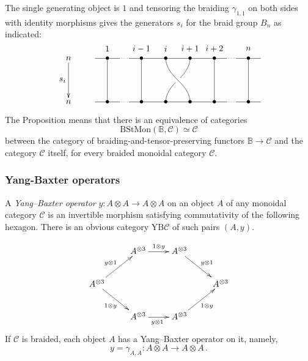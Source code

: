 \documentclass{beamer}
\newcommand{\lra}{\longrightarrow}
\def\CC{{\mathscr C}}
\begin{document}
\begin{frame}
The single generating object is $1$ and tensoring the braiding $\gamma^{}_{1,1}$ on both sides with identity morphisms gives the generators $s_i$ for the braid group $B_n$ as indicated:
\[
\xy
(-30,18)*+{n};(-30,0)*+{n} **\dir{-} \POS?(.5)*+!R{s_i} ?>*\dir{>};
(-19,18);(-9,18) **\dir{-};
(-9,18);(-5,18) **\dir{.};
(-5,18);(35,18) **\dir{-};
(35,18);(39,18) **\dir{.};
(39,18);(49,18) **\dir{-};
(-19,0);(-9,0) **\dir{-};
(-9,0);(-5,0) **\dir{.};
(-5,0);(35,0) **\dir{-};
(35,0);(39,0) **\dir{.};
(39,0);(49,0) **\dir{-};
(-14,18)*{\bullet}="T1"+(0,4)*{1};
(0,18)*{\bullet}="T2"+(0,4)*{i-1};
(10,18)*{\bullet}="T3"+(0,4)*{i};
(20,18)*{\bullet}="T4"+(0,4)*{i+1};
(30,18)*{\bullet}="T5"+(0,4)*{i+2};
(44,18)*{\bullet}="T6"+(0,4)*{n};
(-14,0)*{\bullet}="B1"; 
(0,0)*{\bullet}="B2"; 
(10,0)*{\bullet}="B3"; 
(20,0)*{\bullet}="B4";
(30,0)*{\bullet}="B5";
(44,0)*{\bullet}="B6";
"T1";"B1" **\dir{-};
"T2";"B2" **\dir{-};
(15,9)*{\hole}="a";
(15,9)*{}="a'";
"T3";"a'" **\crv{"T3"+(0,-4)&"a'"+(-2,2)};
"T4";"a" **\crv{"T4"+(0,-4)&"a"+(2,2)};
"a";"B3" **\crv{"a"+(-2,-2)&"B3"+(0,4)};
"a'";"B4" **\crv{"a'"+(2,-2)&"B4"+(0,4)};
"T5";"B5" **\dir{-};
"T6";"B6" **\dir{-};
\endxy
\]
The Proposition means that there is an equivalence of categories
\[
\mathrm{BStMon}(\mathbb{B},\CC) \simeq \CC
\]
between the category of braiding-and-tensor-preserving functors $\mathbb{B} \to \CC$ and the category $\CC$ itself, for every braided monoidal category $\CC$.
\end{frame}

\begin{frame}
\frametitle{Yang-Baxter operators}
A \emph{Yang--Baxter operator} $y : A \otimes A \to A \otimes A$ on an object  $A$ of any monoidal category $\CC$ is an invertible morphism  satisfying commutativity of the following hexagon. There is an obvious category $\mathrm{YB}\CC$ of such pairs $(A,y)$.

\begin{equation*}
\xymatrix{& A^{\otimes 3} \ar[r]^{1\otimes y} & A^{\otimes 3} \ar[rd]^{y\otimes 1} \\
 A^{\otimes 3}\ar[ru]^{y\otimes 1}  \ar[rd]_{1\otimes y}  & & & A^{\otimes 3} \\
 & A^{\otimes 3}  \ar[r]_{y\otimes 1 \ } & A^{\otimes 3} \ar[ru]_{1\otimes y} }
 \end{equation*}
If $\CC$ is braided, each object $A$ has a Yang--Baxter operator on it, namely,
\[
y =  \gamma^{}_{A,A} : A \otimes A \lra A \otimes A\,.
\]
\end{frame}
\end{document}
